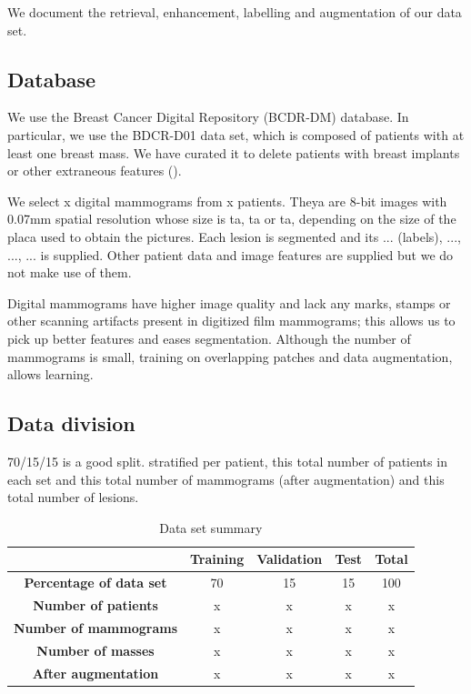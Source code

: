 We document the retrieval, enhancement, labelling and augmentation of our data set.

\subsection{Database}
We use the Breast Cancer Digital Repository (BCDR-DM) database. In particular, we use the BDCR-D01 data set, which is composed of patients with at least one breast mass. We have curated it to delete patients with breast implants or other extraneous features ().

We select x digital mammograms from x patients. Theya are 8-bit images with 0.07mm spatial resolution whose size is ta, ta or ta, depending on the size of the placa used to obtain the pictures. Each lesion is segmented and its ... (labels), ..., ..., ... is supplied. Other patient data and image features are supplied but we do not make use of them.

Digital mammograms have higher image quality and lack any marks, stamps or other scanning artifacts present in digitized film mammograms; this allows us to pick up better features and eases segmentation. Although the number of mammograms is small, training on overlapping patches and data augmentation, allows learning.


\subsection{Data division}
70/15/15 is a good split. stratified per patient, this total number of patients in each set and this total number of mammograms (after augmentation) and this total number of lesions.

\begin{table}[h]
	\centering
	\begin{tabular}{ccccc}
		\hline
		&\textbf{Training} & \textbf{Validation} & \textbf{Test} & \textbf{Total}\\
		\hline 
		\textbf{Percentage of data set}	&70	&15	&15	&100\\
		\textbf{Number of patients} &x&x&x&x\\
		\textbf{Number of mammograms} &x&x&x&x\\
		\textbf{Number of masses} &x&x&x&x\\
		\textbf{After augmentation} &x&x&x&x\\
		\hline
	\end{tabular}
	\caption[Data set summary]{Data set summary}
\end{table}

